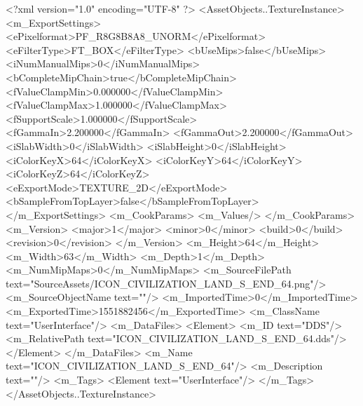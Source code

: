<?xml version="1.0" encoding="UTF-8" ?>
<AssetObjects..TextureInstance>
	<m_ExportSettings>
		<ePixelformat>PF_R8G8B8A8_UNORM</ePixelformat>
		<eFilterType>FT_BOX</eFilterType>
		<bUseMips>false</bUseMips>
		<iNumManualMips>0</iNumManualMips>
		<bCompleteMipChain>true</bCompleteMipChain>
		<fValueClampMin>0.000000</fValueClampMin>
		<fValueClampMax>1.000000</fValueClampMax>
		<fSupportScale>1.000000</fSupportScale>
		<fGammaIn>2.200000</fGammaIn>
		<fGammaOut>2.200000</fGammaOut>
		<iSlabWidth>0</iSlabWidth>
		<iSlabHeight>0</iSlabHeight>
		<iColorKeyX>64</iColorKeyX>
		<iColorKeyY>64</iColorKeyY>
		<iColorKeyZ>64</iColorKeyZ>
		<eExportMode>TEXTURE_2D</eExportMode>
		<bSampleFromTopLayer>false</bSampleFromTopLayer>
	</m_ExportSettings>
	<m_CookParams>
		<m_Values/>
	</m_CookParams>
	<m_Version>
		<major>1</major>
		<minor>0</minor>
		<build>0</build>
		<revision>0</revision>
	</m_Version>
	<m_Height>64</m_Height>
	<m_Width>63</m_Width>
	<m_Depth>1</m_Depth>
	<m_NumMipMaps>0</m_NumMipMaps>
	<m_SourceFilePath text="SourceAssets/ICON_CIVILIZATION_LAND_S_END_64.png"/>
	<m_SourceObjectName text=""/>
	<m_ImportedTime>0</m_ImportedTime>
	<m_ExportedTime>1551882456</m_ExportedTime>
	<m_ClassName text="UserInterface"/>
	<m_DataFiles>
		<Element>
			<m_ID text="DDS"/>
			<m_RelativePath text="ICON_CIVILIZATION_LAND_S_END_64.dds"/>
		</Element>
	</m_DataFiles>
	<m_Name text="ICON_CIVILIZATION_LAND_S_END_64"/>
	<m_Description text=""/>
	<m_Tags>
		<Element text="UserInterface"/>
	</m_Tags>
</AssetObjects..TextureInstance>

